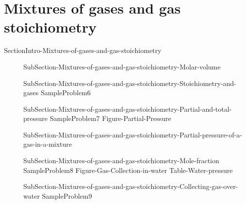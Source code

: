 \documentclass[main.tex]{subfiles}
\newcommand\chapterlabel{Ch-Gas}\setcounter{figurenewcounter}{0}\setcounter{tablenewcounter}{0}\setcounter{formulanewcounter}{0}
\begin{document}
 \section{Mixtures of gases and gas stoichiometry}{SectionIntro-Mixtures-of-gases-and-gas-stoichiometry}
\sloppy 
\begin{description}
 \item[] {SubSection-Mixtures-of-gases-and-gas-stoichiometry-Molar-volume}
\item[]  {SubSection-Mixtures-of-gases-and-gas-stoichiometry-Stoichiometry-and-gases}
{SampleProblem6}
 \item[] 
{SubSection-Mixtures-of-gases-and-gas-stoichiometry-Partial-and-total-pressure}
{SampleProblem7}
 {Figure-Partial-Pressure}
\item[]  {SubSection-Mixtures-of-gases-and-gas-stoichiometry-Partial-pressure-of-a-gas-in-a-mixture}
\item[]  {SubSection-Mixtures-of-gases-and-gas-stoichiometry-Mole-fraction}
{SampleProblem8}
 {Figure-Gas-Collection-in-water}
{Table-Water-pressure}
\item[]  {SubSection-Mixtures-of-gases-and-gas-stoichiometry-Collecting-gas-over-water}
{SampleProblem9}
\end{description}
\end{document}

